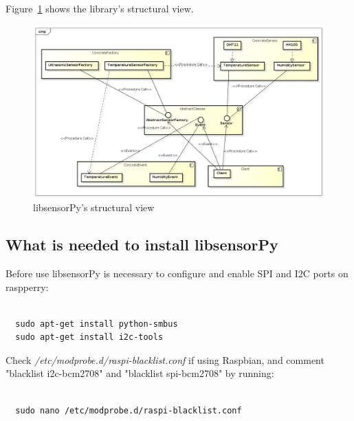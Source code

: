 \documentclass{acm_proc_article-sp}
\begin{document}
Figure~\ref{fig:view} shows the library's structural view.
\begin{figure}[ht]
    \includegraphics[width=1.0\textwidth,natwidth=610,natheight=642]{pictures/VisaoEstrutural.png}
    \caption{libsensorPy's structural view}
    \label{fig:view}
\end{figure}

\subsection{What is needed to install libsensorPy}
Before use libsensorPy is necessary to configure and enable SPI and I2C ports on raspperry:
\renewcommand{\theFancyVerbLine}{
  \sffamily\textcolor[rgb]{0.5,0.5,0.5}{\scriptsize\arabic{FancyVerbLine}}}
\begin{verbatim}

  sudo apt-get install python-smbus
  sudo apt-get install i2c-tools	

\end{verbatim}

Check \textit{/etc/modprobe.d/raspi-blacklist.conf} if using Raspbian, and comment "blacklist i2c-bcm2708" and "blacklist spi-bcm2708" by running:

\renewcommand{\theFancyVerbLine}{
  \sffamily\textcolor[rgb]{0.5,0.5,0.5}{\scriptsize\arabic{FancyVerbLine}}}
\begin{verbatim}

  sudo nano /etc/modprobe.d/raspi-blacklist.conf	

\end{verbatim}
\end{document}
